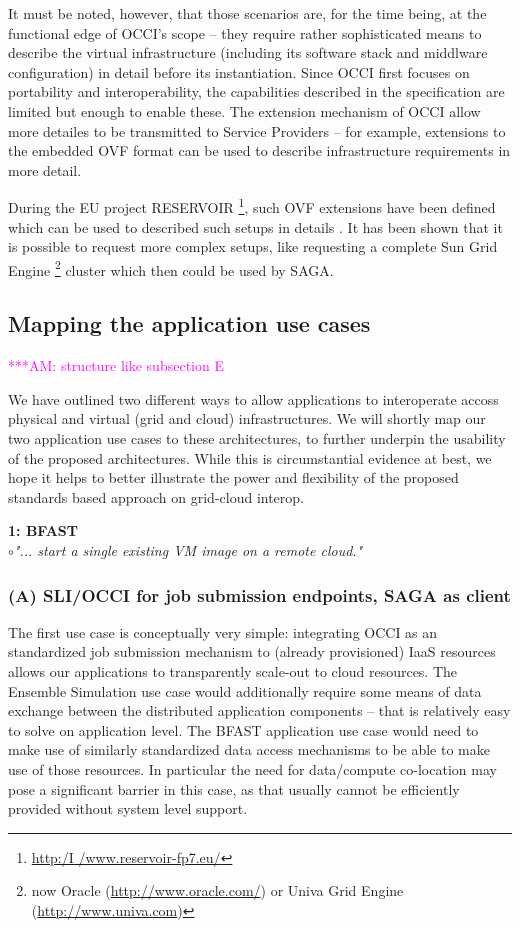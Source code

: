 \documentclass[10pt,conference,final,letterpaper,twoside,twocolumn,]{IEEEtran}
\newcommand{\amnote}[1]{  {\textcolor{magenta} {***AM: #1}}}
\newcommand{\amnote}[1]{}
\newcommand{\I}[1]{\textit{#1}}
\newcommand{\B}[1]{\textbf{#1}}
\newcommand{\bull}{$\circ$}
\begin{document}
 It must be noted, however, that those scenarios are, for the time
 being, at the functional edge of OCCI's scope -- they require rather
 sophisticated means to describe the virtual infrastructure (including
 its software stack and middlware configuration) in detail before
 its instantiation. Since OCCI first focuses on portability and
 interoperability, the capabilities described in the specification are
 limited but enough to enable these. The extension mechanism of OCCI
 allow more detailes to be transmitted to Service Providers -- for
 example, extensions to the embedded OVF format can be used to
 describe infrastructure requirements in more detail.

 During the EU project RESERVOIR
 \footnote{\url{http:/I /www.reservoir-fp7.eu/}}, such OVF extensions
 have been defined which can be used to described such setups in
 details \cite{comsware09}.  It has been shown that it is possible to
 request more complex setups, like requesting a complete Sun Grid
 Engine \footnote{now Oracle (\url{http://www.oracle.com/}) or Univa
 Grid Engine (\url{http://www.univa.com})} cluster which then could be
 used by SAGA.


 \subsection{Mapping the application use cases}

 \amnote{structure like subsection E}

 We have outlined two different ways to allow applications to
 interoperate accoss physical and virtual (grid and cloud)
 infrastructures.  We will shortly map our two application use cases
 to these architectures, to further underpin the usability of the
 proposed architectures.  While this is circumstantial evidence at
 best, we hope it helps to better illustrate the power and flexibility
 of the proposed standards based approach on grid-cloud interop.

 \noindent
 \B{1: BFAST}\\

 \bull \I{"... start a single existing VM image on a remote cloud."}\\

 \subsubsection*{(A) SLI/OCCI for job submission endpoints, SAGA as client}

 The first use case is conceptually very simple: integrating OCCI as
 an standardized job submission mechanism to (already provisioned)
 IaaS resources allows our applications to transparently scale-out to
 cloud resources.  The Ensemble Simulation use case would additionally
 require some means of data exchange between the distributed
 application components -- that is relatively easy to solve on
 application level.  The BFAST application use case would need to make
 use of similarly standardized data access mechanisms to be able to
 make use of those resources.  In particular the need for data/compute
 co-location may pose a significant barrier in this case, as that
 usually cannot be efficiently provided without system level support.
  
\end{document}

